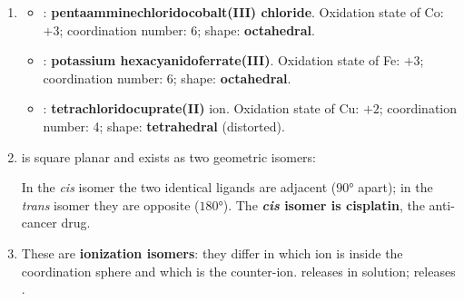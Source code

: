 \documentclass[11pt]{article}
\newcommand{\legende}[1]{\par\vspace{6pt}{\popsemi\fontsize{9}{11.5}\selectfont\color{popmuted}#1}}
\begin{document}
\begin{corrige}
\begin{enumerate}
\item
\begin{itemize}
\item {}: \textbf{pentaamminechloridocobalt(III) chloride}. Oxidation state of Co: $+3$; coordination number: 6; shape: \textbf{octahedral}.
\item {}: \textbf{potassium hexacyanidoferrate(III)}. Oxidation state of Fe: $+3$; coordination number: 6; shape: \textbf{octahedral}.
\item {}: \textbf{tetrachloridocuprate(II)} ion. Oxidation state of Cu: $+2$; coordination number: 4; shape: \textbf{tetrahedral} (distorted).
\end{itemize}

\item \ce{[Pt(NH3)2Cl2]} is square planar and exists as two geometric isomers:

\begin{popfigure}
\begin{center}
\end{center}
\legende{\emph{cis}- and \emph{trans}- \ce{[Pt(NH3)2Cl2]} (square planar).}
\end{popfigure}

In the \emph{cis} isomer the two identical ligands are adjacent ($90°$ apart); in the \emph{trans} isomer they are opposite ($180°$). The \textbf{\emph{cis} isomer is cisplatin}, the anti-cancer drug.

\item These are \textbf{ionization isomers}: they differ in which ion is inside the coordination sphere and which is the counter-ion.  releases  in solution;  releases .


\end{enumerate}
\end{corrige}
\end{document}
